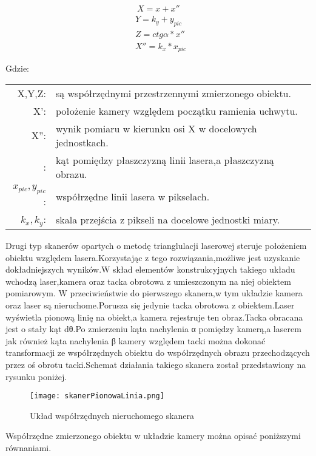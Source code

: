 \documentclass[12pt]{article}
\begin{document}
    


\begin{equation}
    \begin{aligned}
        & \ X=x+x'' \\
          & Y=k_{y}+y_{pic} \\
          & Z=ctg\alpha *x''\\
          & X''=k_{x} *x_{pic}\
    \end{aligned}
\end{equation}

Gdzie:\\
\hspace*{3em}
\begin{tabular}{rl}
    X,Y,Z:& są współrzędnymi przestrzennymi zmierzonego obiektu. \\
    X':& położenie kamery względem początku ramienia uchwytu. \\
    X'':& wynik pomiaru w kierunku osi X w docelowych jednostkach. \\
    \alpha:& kąt pomiędzy płaszczyzną linii lasera,a płaszczyzną obrazu. \\
    $x_{pic},y_{pic}$:& współrzędne linii lasera w pikselach. \\
    $k_{x},k_{y}$:& skala przejścia z pikseli na docelowe jednostki miary. \\
\end{tabular}
\newline
\newline
Drugi typ skanerów opartych o metodę trianglulacji laserowej steruje położeniem obiektu względem lasera.Korzystając z tego rozwiązania,możliwe jest uzyskanie dokładniejszych wyników.W skład elementów konstrukcyjnych takiego układu wchodzą laser,kamera oraz tacka obrotowa z umieszczonym na niej obiektem pomiarowym.
W przeciwieństwie do pierwszego skanera,w tym układzie kamera oraz laser są nieruchome.Porusza się jedynie tacka obrotowa z obiektem.Laser wyświetla pionową linię na obiekt,a kamera rejestruje ten obraz.Tacka obracana jest o stały kąt dθ.Po zmierzeniu kąta nachylenia α pomiędzy kamerą,a laserem jak również kąta nachylenia β kamery względem tacki można dokonać transformacji ze współrzędnych obiektu do współrzędnych obrazu przechodzących przez oś obrotu tacki.Schemat działania takiego skanera został przedstawiony na rysunku poniżej.

\begin{figure}[H]
  \centering
  \texttt{[image: skanerPionowaLinia.png]}
  \caption{Układ współrzędnych nieruchomego skanera \cite{mikulski2013metody}}   
  \label{fig:picture}
\end{figure}
\newline
Współrzędne zmierzonego obiektu w układzie kamery można opisać poniższymi równaniami.
\end{document}
